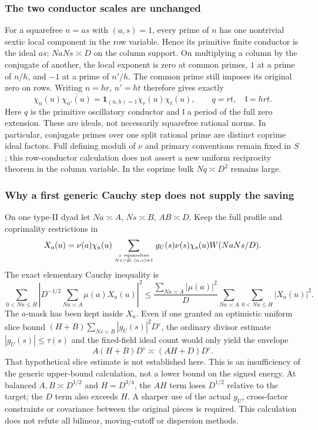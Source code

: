 \documentclass[11pt,oneside,openany]{book}
\theoremstyle{definition}\newtheorem{definition}[theorem]{Definition}
\theoremstyle{remark}\newtheorem{remark}[theorem]{Remark}
\begin{document}
\subsubsection{The two conductor scales are unchanged}
For a squarefree $n=as$ with $(a,s)=1$, every prime of $n$ has one
nontrivial sextic local component in the row variable. Hence its primitive
finite conductor is the ideal $as$; $NaNs\asymp D$ on the column support.
On multiplying a column by the conjugate of another, the local exponent
is zero at common primes, $1$ at a prime of $n/h$, and $-1$ at a prime
of $n'/h$. The common prime still imposes its original zero on rows.
Writing $n=h r$, $n'=h t$ therefore gives exactly
\[
 \chi_n(u)\overline{\chi_{n'}(u)}
 =\mathbf1_{(u,h)=1}\chi_r(u)\overline{\chi_t(u)},\qquad
 q=rt,\quad\mathfrak l=hrt.
\]
Here $q$ is the primitive oscillatory conductor and $\mathfrak l$ a
period of the full zero extension. These are ideals, not necessarily
squarefree rational norms. In particular, conjugate primes over one split
rational prime are distinct coprime ideal factors. Full defining moduli
of $\nu$ and primary conventions remain fixed in $S$; this row-conductor
calculation does not assert a new uniform reciprocity theorem in the
column variable. In the coprime bulk $Nq\asymp D^2$ remains large.

\subsubsection{Why a first generic Cauchy step does not supply the saving}
On one type-II dyad let $Na\asymp A$, $Ns\asymp B$, $AB\asymp D$.
Keep the full profile and coprimality restrictions in
\[
 X_a(u)=\nu(a)\chi_a(u)
  \sum_{s\ {\rm squarefree}\atop Ns\asymp B,\,(a,s)=1}
  g_U(s)\nu(s)\chi_s(u)W(NaNs/D).
\]
The exact elementary Cauchy inequality is
\[
 \sum_{0<Nu\le H}\left|D^{-1/2}\sum_{Na\asymp A}\mu(a)X_a(u)\right|^2
 \le \frac{\sum_{Na\asymp A}|\mu(a)|^2}{D}
       \sum_{Na\asymp A}\sum_{0<Nu\le H}|X_a(u)|^2.
\]
The $a$-mask has been kept inside $X_a$. Even if one granted an optimistic
uniform slice bound $(H+B)\sum_{Ns\asymp B}|g_U(s)|^2D^\varepsilon$,
the ordinary divisor estimate $|g_U(s)|\le\tau(s)$ and the fixed-field
ideal count would only yield the envelope
\[
 A(H+B)D^\varepsilon\asymp(AH+D)D^\varepsilon.
\]
That hypothetical slice estimate is not established here. This is an
insufficiency of the generic upper-bound calculation, not a lower bound
on the signed energy. At balanced $A,B\asymp D^{1/2}$ and $H=D^{3/4}$,
the $AH$ term loses $D^{1/2}$ relative to the target; the $D$ term also
exceeds $H$. A sharper use of the actual $g_U$, cross-factor constraints
or covariance between the original pieces is required. This calculation
does not refute all bilinear, moving-cutoff or dispersion methods.
\end{document}
